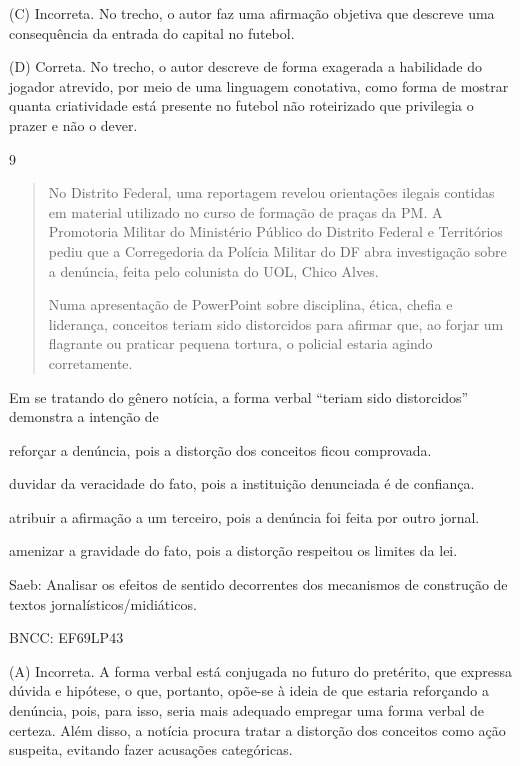 (C) Incorreta. No trecho, o autor faz uma afirmação objetiva que
descreve uma consequência da entrada do capital no futebol.

(D) Correta. No trecho, o autor descreve de forma exagerada a habilidade
do jogador atrevido, por meio de uma linguagem conotativa, como forma de
mostrar quanta criatividade está presente no futebol não roteirizado que
privilegia o prazer e não o dever.

\num{9}

\begin{quote}
No Distrito Federal, uma reportagem revelou orientações ilegais contidas
em material utilizado no curso de formação de praças da PM. A Promotoria
Militar do Ministério Público do Distrito Federal e Territórios pediu
que a Corregedoria da Polícia Militar do DF abra investigação sobre a
denúncia, feita pelo colunista do UOL, Chico Alves.

Numa apresentação de PowerPoint sobre disciplina, ética, chefia e
liderança, conceitos teriam sido distorcidos para afirmar que, ao forjar
um flagrante ou praticar pequena tortura, o policial estaria agindo
corretamente.
\end{quote}


Em se tratando do gênero notícia, a forma verbal ``teriam sido
distorcidos'' demonstra a intenção de

\begin{escolha}
\item reforçar a denúncia, pois a distorção dos conceitos ficou comprovada.

\item duvidar da veracidade do fato, pois a instituição denunciada é de
confiança.

\item atribuir a afirmação a um terceiro, pois a denúncia foi feita por
outro jornal.

\item amenizar a gravidade do fato, pois a distorção respeitou os limites
da lei.
\end{escolha}

Saeb: Analisar os efeitos de sentido decorrentes dos mecanismos de
construção de textos jornalísticos/midiáticos.

BNCC: EF69LP43

(A) Incorreta. A forma verbal está conjugada no futuro do pretérito, que
expressa dúvida e hipótese, o que, portanto, opõe-se à ideia de que
estaria reforçando a denúncia, pois, para isso, seria mais adequado
empregar uma forma verbal de certeza. Além disso, a notícia procura
tratar a distorção dos conceitos como ação suspeita, evitando fazer
acusações categóricas.

